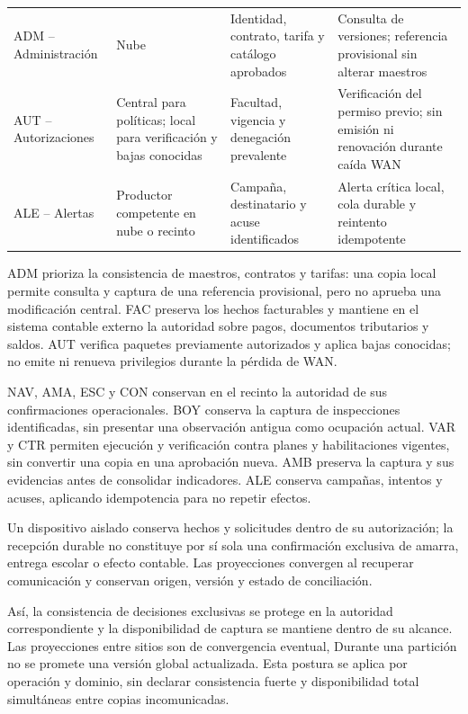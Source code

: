 \begin{longtable}{@{}L{.24\textwidth}L{.20\textwidth}L{.28\textwidth}L{\dimexpr.28\textwidth-18pt\relax}@{}}
ADM -- Administración & Nube & Identidad, contrato, tarifa y catálogo aprobados & Consulta de versiones; referencia provisional sin alterar maestros \\
AUT -- Autorizaciones & Central para políticas; local para verificación y bajas conocidas & Facultad, vigencia y denegación prevalente & Verificación del permiso previo; sin emisión ni renovación durante caída WAN \\
ALE -- Alertas & Productor competente en nube o recinto & Campaña, destinatario y acuse identificados & Alerta crítica local, cola durable y reintento idempotente \\
\end{longtable}
\endgroup

ADM prioriza la consistencia de maestros, contratos y tarifas: una copia local permite consulta y captura de una referencia provisional, pero no aprueba una modificación central. FAC preserva los hechos facturables y mantiene en el sistema contable externo la autoridad sobre pagos, documentos tributarios y saldos. AUT verifica paquetes previamente autorizados y aplica bajas conocidas; no emite ni renueva privilegios durante la pérdida de WAN.

NAV, AMA, ESC y CON conservan en el recinto la autoridad de sus confirmaciones operacionales. BOY conserva la captura de inspecciones identificadas, sin presentar una observación antigua como ocupación actual. VAR y CTR permiten ejecución y verificación contra planes y habilitaciones vigentes, sin convertir una copia en una aprobación nueva. AMB preserva la captura y sus evidencias antes de consolidar indicadores. ALE conserva campañas, intentos y acuses, aplicando idempotencia para no repetir efectos.

Un dispositivo aislado conserva hechos y solicitudes dentro de su autorización; la recepción durable no constituye por sí sola una confirmación exclusiva de amarra, entrega escolar o efecto contable. Las proyecciones convergen al recuperar comunicación y conservan origen, versión y estado de conciliación.

Así, la consistencia de decisiones exclusivas se protege en la autoridad correspondiente y la disponibilidad de captura se mantiene dentro de su alcance. Las proyecciones entre sitios son de convergencia eventual, Durante una partición no se promete una versión global actualizada. Esta postura se aplica por operación y dominio, sin declarar consistencia fuerte y disponibilidad total simultáneas entre copias incomunicadas.

